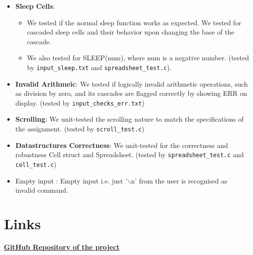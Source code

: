 \documentclass[10pt,a4paper]{article}  %
\begin{document}
\begin{itemize}
\begin{itemize}
    \end{itemize}
    \item \textbf{Sleep Cells}: 
    \begin{itemize}
        \item We tested if the normal sleep function works as expected. We tested for cascaded sleep cells and their behavior upon changing the base of the cascade. 
        \item We also tested for SLEEP(num), where num is a negative number. (tested by \texttt{input\_sleep.txt} and \texttt{spreadsheet\_test.c}).
    \end{itemize}
    \item \textbf{Invalid Arithmeic}: We tested if logically invalid arithmetic operations, such as division by zero, and its cascades are flagged correctly by showing ERR on display. (tested by \texttt{input\_checks\_err.txt})
    \item \textbf{Scrolling}: We unit-tested the scrolling nature to match the specifications of the assignment. (tested by \texttt{scroll\_test.c})
    \item \textbf{Datastructures Correctness}: We unit-tested for the correctness and robustness Cell struct and Spreadsheet. (tested by \texttt{spreadsheet\_test.c} and \texttt{cell\_test.c})
    \item{Empty input} : Empty input i.e. just '$\backslash$n' from the user is recognised as invalid command.
\end{itemize}

\section{Links}

 \textbf{\href{https://github.com/SamyakSS83/cop}{GitHub Repository of the project}} \\
\end{document}

